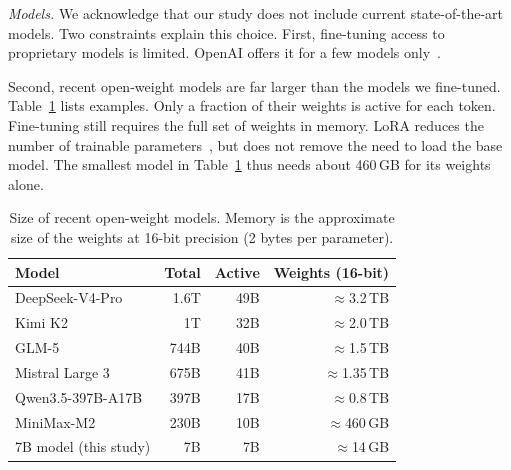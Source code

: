 \textit{Models.}
\label{sec:models-ttv}
We acknowledge that our study does not include current state-of-the-art models. Two constraints explain this choice.
First, fine-tuning access to proprietary models is limited.
OpenAI offers it for a few models only~\cite{azure2026finetuning}.

Second, recent open-weight models are far larger than the models we fine-tuned.
Table~\ref{tab:open-sizes} lists examples.
Only a fraction of their weights is active for each token.
Fine-tuning still requires the full set of weights in memory.
LoRA reduces the number of trainable parameters~\cite{hu2022lora},
but does not remove the need to load the base model.
The smallest model in Table~\ref{tab:open-sizes} thus needs about 460\,GB for its weights alone.

\begin{table}[t]
\centering
\caption{Size of recent open-weight models. Memory is the approximate size of the weights at 16-bit precision (2 bytes per parameter).}
\label{tab:open-sizes}
\small
\begin{tabular}{lrrr}
\toprule
Model & Total & Active & Weights (16-bit) \\
\midrule
DeepSeek-V4-Pro~\cite{deepseek2026v4} & 1.6T & 49B & $\approx$3.2\,TB \\
Kimi K2~\cite{kimi2025k2} & 1T & 32B & $\approx$2.0\,TB \\
GLM-5~\cite{glm2026glm5} & 744B & 40B & $\approx$1.5\,TB \\
Mistral Large 3~\cite{mistral2025large3} & 675B & 41B & $\approx$1.35\,TB \\
Qwen3.5-397B-A17B~\cite{qwen2026qwen35} & 397B & 17B & $\approx$0.8\,TB \\
MiniMax-M2~\cite{minimax2026m2} & 230B & 10B & $\approx$460\,GB \\
\midrule
7B model (this study) & 7B & 7B & $\approx$14\,GB \\
\bottomrule
\end{tabular}
\end{table}

